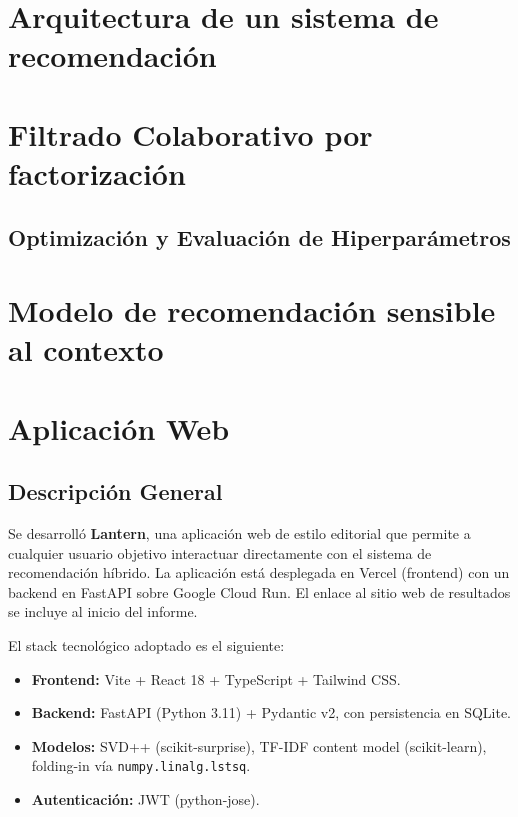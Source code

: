 \documentclass[11pt,a4paper]{article}
\begin{document}
\section{Arquitectura de un sistema de recomendación}



\section{Filtrado Colaborativo por factorización}


\subsection{Optimización y Evaluación de Hiperparámetros}


\section{Modelo de  recomendación sensible al contexto}


\section{Aplicación Web}

\subsection{Descripción General}

Se desarrolló \textbf{Lantern}, una aplicación web de estilo editorial que permite a cualquier usuario objetivo interactuar directamente con el sistema de recomendación híbrido. La aplicación está desplegada en Vercel (frontend) con un backend en FastAPI sobre Google Cloud Run. El enlace al sitio web de resultados se incluye al inicio del informe.

El stack tecnológico adoptado es el siguiente:

\begin{itemize}
    \item \textbf{Frontend:} Vite + React 18 + TypeScript + Tailwind CSS.
    \item \textbf{Backend:} FastAPI (Python 3.11) + Pydantic v2, con persistencia en SQLite.
    \item \textbf{Modelos:} SVD++ (scikit-surprise), TF-IDF content model (scikit-learn), folding-in vía \texttt{numpy.linalg.lstsq}.
    \item \textbf{Autenticación:} JWT (python-jose).
\end{itemize}
\end{document}
